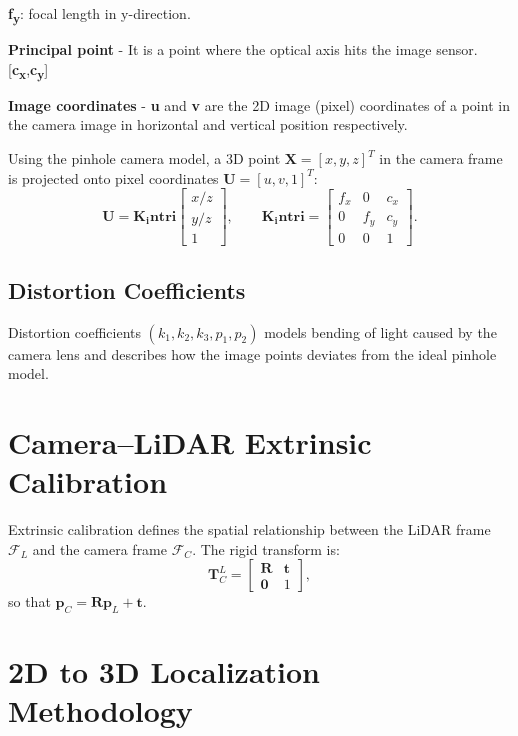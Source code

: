 \documentclass[12pt,a4paper]{report}
\begin{document}
\textbf{f\textsubscript{y}}: focal length in y-direction.

\textbf{Principal point} - It is a point where the optical axis hits the image sensor. [{\textbf{c\textsubscript{x}}},{\textbf{c\textsubscript{y}}}]

\textbf{Image coordinates} - {\textbf{u}} and {\textbf{v}} are the 2D image (pixel) coordinates of a point in the camera image in horizontal and vertical position respectively.

Using the pinhole camera model, a 3D point $\mathbf{X}=[x,y,z]^T$ in the camera frame is projected onto pixel coordinates $\mathbf{U}=[u,v,1]^T$:
\begin{equation}
\mathbf{U} = \mathbf{K_intri}
\begin{bmatrix}
x/z \\
y/z \\
1
\end{bmatrix},
\qquad
\mathbf{K_intri}=
\begin{bmatrix}
f_x & 0 & c_x \\
0 & f_y & c_y \\
0 & 0 & 1
\end{bmatrix}.
\end{equation}

\subsection{Distortion Coefficients}
Distortion coefficients $(k_1,k_2,k_3,p_1,p_2)$ models bending of light caused by the camera lens and describes how the image points deviates from the ideal pinhole model.


\section{Camera--LiDAR Extrinsic Calibration}
Extrinsic calibration defines the spatial relationship between the LiDAR frame $\mathcal{F}_L$ and the camera frame $\mathcal{F}_C$. The rigid transform is:
\begin{equation}
\mathbf{T}_{C}^{L}=
\begin{bmatrix}
\mathbf{R} & \mathbf{t} \\
\mathbf{0} & 1
\end{bmatrix},
\end{equation}
so that $\mathbf{p}_C=\mathbf{R}\mathbf{p}_L+\mathbf{t}$. 

\section{2D to 3D Localization Methodology}
\end{document}
